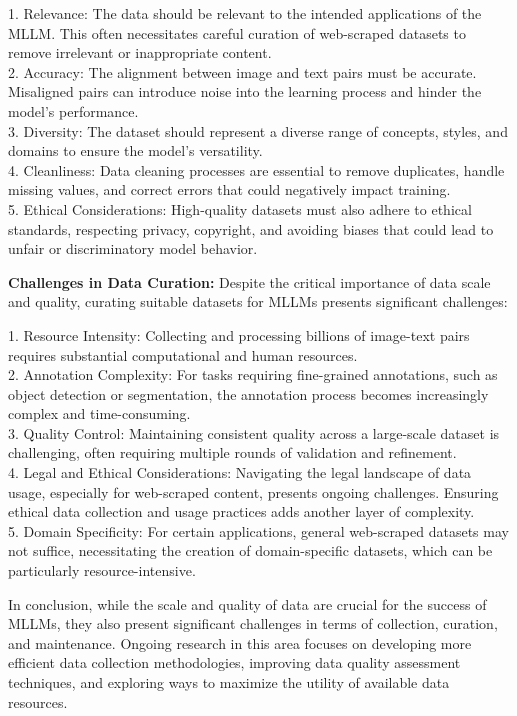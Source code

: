 1. Relevance: The data should be relevant to the intended applications of the MLLM. This often necessitates careful curation of web-scraped datasets to remove irrelevant or inappropriate content.
\\
2. Accuracy: The alignment between image and text pairs must be accurate. Misaligned pairs can introduce noise into the learning process and hinder the model's performance.
\\
3. Diversity: The dataset should represent a diverse range of concepts, styles, and domains to ensure the model's versatility.
\\
4. Cleanliness: Data cleaning processes are essential to remove duplicates, handle missing values, and correct errors that could negatively impact training.
\\
5. Ethical Considerations: High-quality datasets must also adhere to ethical standards, respecting privacy, copyright, and avoiding biases that could lead to unfair or discriminatory model behavior.

\textbf{Challenges in Data Curation:} Despite the critical importance of data scale and quality, curating suitable datasets for MLLMs presents significant challenges:

1. Resource Intensity: Collecting and processing billions of image-text pairs requires substantial computational and human resources.
\\
2. Annotation Complexity: For tasks requiring fine-grained annotations, such as object detection or segmentation, the annotation process becomes increasingly complex and time-consuming.
\\
3. Quality Control: Maintaining consistent quality across a large-scale dataset is challenging, often requiring multiple rounds of validation and refinement.
\\
4. Legal and Ethical Considerations: Navigating the legal landscape of data usage, especially for web-scraped content, presents ongoing challenges. Ensuring ethical data collection and usage practices adds another layer of complexity.
\\
5. Domain Specificity: For certain applications, general web-scraped datasets may not suffice, necessitating the creation of domain-specific datasets, which can be particularly resource-intensive.

In conclusion, while the scale and quality of data are crucial for the success of MLLMs, they also present significant challenges in terms of collection, curation, and maintenance. Ongoing research in this area focuses on developing more efficient data collection methodologies, improving data quality assessment techniques, and exploring ways to maximize the utility of available data resources.

